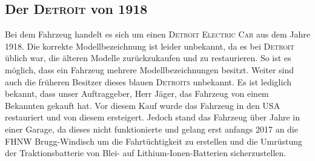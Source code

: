 \subsection{Der \textsc{Detroit} von 1918}

Bei dem Fahrzeug handelt es sich um einen \textsc{Detroit Electric Car} aus dem Jahre 1918. Die korrekte Modellbezeichnung ist leider unbekannt, da es bei \textsc{Detroit} üblich war, die älteren Modelle zurückzukaufen und zu restaurieren. So ist es möglich, dass ein Fahrzeug mehrere Modellbezeichnungen besitzt. Weiter sind auch die früheren Besitzer dieses blauen \textsc{Detroits} unbekannt. Es ist lediglich bekannt, dass unser Auftraggeber, Herr Jäger, das Fahrzeug von einem Bekannten gekauft hat. Vor diesem Kauf wurde das Fahrzeug in den USA restauriert und von diesem ersteigert. Jedoch stand das Fahrzeug über Jahre in einer Garage, da dieses nicht funktionierte und gelang erst anfangs 2017 an die FHNW Brugg-Windisch um die Fahrtüchtigkeit zu erstellen und die Umrüstung der Traktionsbatterie von Blei- auf Lithium-Ionen-Batterien sicherzustellen.

\newpage